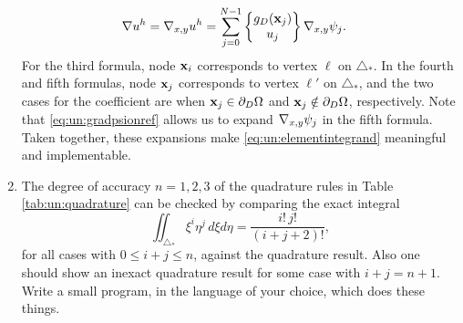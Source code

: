 \begin{enumerate}
\begin{align*}
\nabla u^h &= \nabla_{x,y} u^h = \sum_{j=0}^{N-1} \left\{\begin{matrix} g_D(\mathbf{x}_j) \\ u_j \end{matrix}\right\} \nabla_{x,y} \psi_j.
\end{align*}
For the third formula, node $\mathbf{x}_i$ corresponds to vertex $\ell$ on $\triangle_\ast$.  In the fourth and fifth formulas, node $\mathbf{x}_j$ corresponds to vertex $\ell'$ on $\triangle_\ast$, and the two cases for the coefficient are when $\mathbf{x}_j \in \partial_D \Omega$ and $\mathbf{x}_j \notin \partial_D \Omega$, respectively.  Note that \eqref{eq:un:gradpsionref} allows us to expand $\nabla_{x,y} \psi_j$ in the fifth formula.  Taken together, these expansions make \eqref{eq:un:elementintegrand} meaningful and implementable.
\item  \label{exer:un:checkquadrature}  The degree of accuracy $n=1,2,3$ of the quadrature rules in Table \ref{tab:un:quadrature} can be checked by comparing the exact integral
\begin{equation}
\iint_{\triangle_\ast} \xi^i \eta^j\,d\xi d\eta = \frac{i!\,j!}{(i+j+2)!}, \label{eq:un:checkquadrature}
\end{equation}
for all cases with $0\le i+j\le n$, against the quadrature result.  Also one should show an inexact quadrature result for some case with $i+j=n+1$.  Write a small program, in the language of your choice, which does these things.
\end{enumerate}


